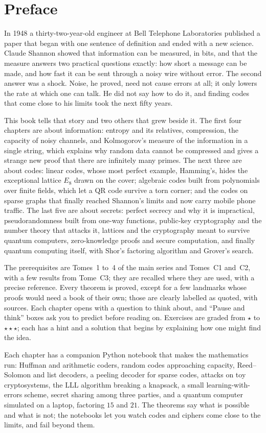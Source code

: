 \chapter*{Preface}

In 1948 a thirty-two-year-old engineer at Bell Telephone Laboratories published a paper that began with one sentence of
definition and ended with a new science. Claude Shannon showed that information can be measured, in bits, and that the
measure answers two practical questions exactly: how short a message can be made, and how fast it can be sent through a
noisy wire without error. The second answer was a shock. Noise, he proved, need not cause errors at all; it only lowers
the rate at which one can talk. He did not say how to do it, and finding codes that come close to his limits took the
next fifty years.

This book tells that story and two others that grew beside it. The first four chapters are about information:
entropy and its relatives, compression, the capacity of noisy channels, and Kolmogorov's measure of the information
in a single string, which explains why random data cannot be compressed and gives a strange new proof that there are
infinitely many primes. The next three are about codes: linear codes, whose most perfect example, Hamming's, hides the
exceptional lattice $E_8$ drawn on the cover; algebraic codes built from polynomials over finite fields, which let a
QR code survive a torn corner; and the codes on sparse graphs that finally reached Shannon's limits and now carry
mobile phone traffic. The last five are about secrets: perfect secrecy and why it is impractical, pseudorandomness
built from one-way functions, public-key cryptography and the number theory that attacks it, lattices and the
cryptography meant to survive quantum computers, zero-knowledge proofs and secure computation, and finally quantum
computing itself, with Shor's factoring algorithm and Grover's search.

The prerequisites are Tomes~1 to~4 of the main series and Tomes~C1 and~C2, with a few results from Tome~C3; they are
recalled where they are used, with a precise reference. Every theorem is proved, except for a few landmarks whose
proofs would need a book of their own; those are clearly labelled as quoted, with sources. Each chapter opens with a
question to think about, and ``Pause and think'' boxes ask you to predict before reading on. Exercises are graded from
$\star$ to $\star\star\star$; each has a hint and a solution that begins by explaining how one might find the idea.

Each chapter has a companion Python notebook that makes the mathematics run: Huffman and arithmetic coders, random
codes approaching capacity, Reed--Solomon and list decoders, a peeling decoder for sparse codes, attacks on toy
cryptosystems, the LLL algorithm breaking a knapsack, a small learning-with-errors scheme, secret sharing among three
parties, and a quantum computer simulated on a laptop, factoring $15$ and $21$. The theorems say what is possible and
what is not; the notebooks let you watch codes and ciphers come close to the limits, and fail beyond them.
